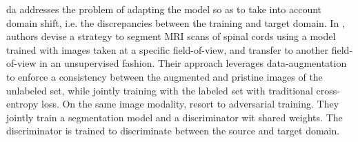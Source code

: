\gls{da} addresses the problem of adapting the model so as to take into account domain shift, i.e. the discrepancies between the training and target domain.
In \cite{perone19}, authors devise a strategy to segment MRI scans of spinal cords using a model trained with images taken at a specific field-of-view, and transfer to another field-of-view in an unsupervised fashion.
Their approach leverages data-augmentation to enforce a consistency between the augmented and pristine images of the unlabeled set, while jointly training with the labeled set with traditional cross-entropy loss.
On the same image modality, \cite{li20} resort to adversarial training. They jointly train a segmentation model and a discriminator wit shared weights. The discriminator is trained to discriminate between the source and target domain.





